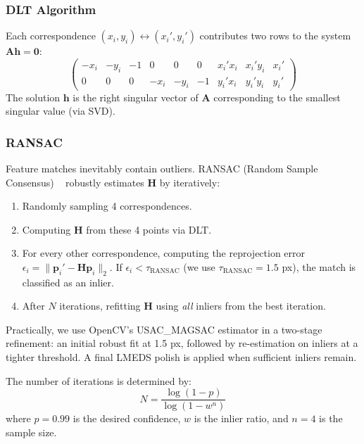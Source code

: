 \documentclass[conference]{IEEEtran}
\begin{document}
\subsubsection{DLT Algorithm}
Each correspondence $(x_i, y_i) \leftrightarrow (x_i', y_i')$ contributes two
rows to the system $\mathbf{A}\mathbf{h} = \mathbf{0}$:
\begin{equation}
  \begin{pmatrix}
    -x_i & -y_i & -1 & 0 & 0 & 0 & x_i'x_i & x_i'y_i & x_i' \\
    0 & 0 & 0 & -x_i & -y_i & -1 & y_i'x_i & y_i'y_i & y_i'
  \end{pmatrix}
\end{equation}
The solution $\mathbf{h}$ is the right singular vector of $\mathbf{A}$
corresponding to the smallest singular value (via SVD).

\subsubsection{RANSAC}
\label{sec:ransac}
Feature matches inevitably contain outliers. RANSAC (Random Sample Consensus)
~\cite{fischler1981} robustly estimates $\mathbf{H}$ by iteratively:
\begin{enumerate}
  \item Randomly sampling 4 correspondences.
  \item Computing $\mathbf{H}$ from these 4 points via DLT.
  \item For every other correspondence, computing the reprojection error
        $\epsilon_i = \|\mathbf{p}_i' - \mathbf{H}\mathbf{p}_i\|_2$. If
        $\epsilon_i < \tau_{\text{RANSAC}}$ (we use $\tau_{\text{RANSAC}} = 1.5$ px),
        the match is classified as an inlier.
  \item After $N$ iterations, refitting $\mathbf{H}$ using \emph{all} inliers
        from the best iteration.
\end{enumerate}

Practically, we use OpenCV's USAC\_MAGSAC estimator in a two-stage refinement:
an initial robust fit at 1.5 px, followed by re-estimation on inliers at a
tighter threshold. A final LMEDS polish is applied when sufficient inliers
remain.

The number of iterations is determined by:
\begin{equation}
  N = \frac{\log(1 - p)}{\log(1 - w^n)}
\end{equation}
where $p = 0.99$ is the desired confidence, $w$ is the inlier ratio, and
$n = 4$ is the sample size.
\end{document}
